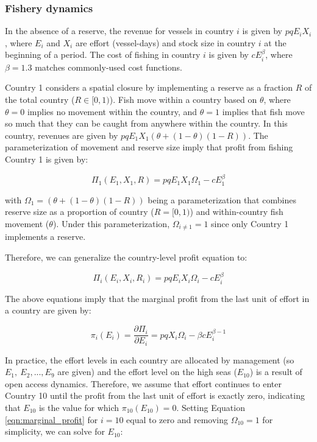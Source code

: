 \documentclass[12pt]{article}
\begin{document}
\subsubsection{Fishery dynamics}

In the absence of a reserve, the revenue for vessels in country $i$ is given by $pqE_iX_i$, where $E_i$ and $X_i$ are effort (vessel-days) and stock size in country $i$ at the beginning of a period. The cost of fishing in country $i$ is given by $cE_i^\beta$, where $\beta = 1.3$ matches commonly-used cost functions.

Country 1 considers a spatial closure by implementing a reserve as a fraction $R$ of the total country ($R \in[0,1)$). Fish move within a country based on $\theta$, where $\theta = 0$ implies no movement within the country, and $\theta = 1$ implies that fish move so much that they can be caught from anywhere within the country. In this country, revenues are given by $pqE_1X_1(\theta + (1 - \theta)(1 - R))$. The parameterization of movement and reserve size imply that profit from fishing Country 1 is given by:

$$
\Pi_1(E_1,X_1,R) = pqE_1X_1\Omega_1-cE_1^\beta
$$

\noindent with $\Omega_1 = (\theta + (1 - \theta)(1 - R))$ being a parameterization that combines reserve size as a proportion of country ($R =  [0, 1)$) and within-country fish movement ($\theta$). Under this parameterization, $\Omega_{i \neq 1} = 1$ since only Country 1 implements a reserve.

Therefore, we can generalize the country-level profit equation to:

$$
\Pi_i(E_i,X_i, R_i) = pqE_iX_i\Omega_i-cE_i^\beta
$$

\noindent The above equations imply that the marginal profit from the last unit of effort in a country are given by:

\begin{equation}
\pi_i(E_i) = \frac{\partial \Pi_i}{\partial E_i} = pqX_i\Omega_i - \beta cE_i^{\beta-1}
\label{eqn:marginal_profit}
\end{equation}

In practice, the effort levels in each country are allocated by management (so $E_{1},\ E_{2},...,E_{9}$ are given) and the effort level on the high seas ($E_{10}$) is a result of open access dynamics. Therefore, we assume that effort continues to enter Country 10 until the profit from the last unit of effort is exactly zero, indicating that $E_{10}$ is the value for which $\pi_{10}(E_{10})  = 0$. Setting Equation \ref{eqn:marginal_profit} for $i = 10$ equal to zero and removing $\Omega_{10} = 1$ for simplicity, we can solve for $E_{10}$:
\end{document}
